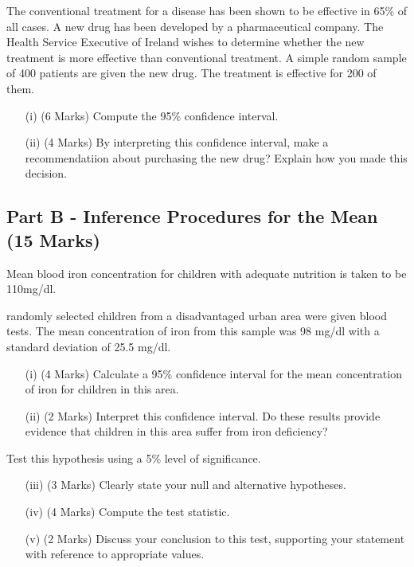 \documentclass[a4paper,12pt]{article}
\begin{document}
The conventional treatment for a disease has been shown to be effective in 65\% of all 
cases. A new drug has been developed by a pharmaceutical company. The Health Service Executive of Ireland
wishes to determine whether the new treatment is more effective than conventional treatment. 
A simple random sample of 400 patients are given the new drug. The treatment is effective for 200 of them.


\begin{itemize}
	\item[(i)](6 Marks) Compute the 95\% confidence interval.
	\item[(ii)](4 Marks) By interpreting this confidence interval, make a recommendatiion about purchasing the new drug? Explain how you made this decision.
\end{itemize}

\subsection*{Part B - Inference Procedures for the Mean (15 Marks)}
Mean blood iron concentration for children with adequate nutrition is taken to be 110mg/dl. \\ \smallskip


 randomly selected children from a disadvantaged urban area were given blood tests. The mean concentration of iron from this sample was 98 mg/dl with a standard deviation of 25.5 mg/dl.
\begin{itemize}
	\item[(i)] (4 Marks) Calculate a 95\% confidence interval for the mean concentration of iron for children in this area. 
	\item[(ii)](2 Marks) Interpret this confidence interval.  Do these results provide evidence that children in this area suffer from iron deficiency? 
\end{itemize}
\medskip
Test this hypothesis using a 5\% level of significance. 

\begin{itemize}
	\item[(iii)](3 Marks) Clearly state your null and alternative hypotheses.
	\item[(iv)](4 Marks) Compute the test statistic.
	\item[(v)](2 Marks) Discuss your conclusion to this test, supporting your statement with reference to appropriate values.
\end{itemize}
\end{document}
